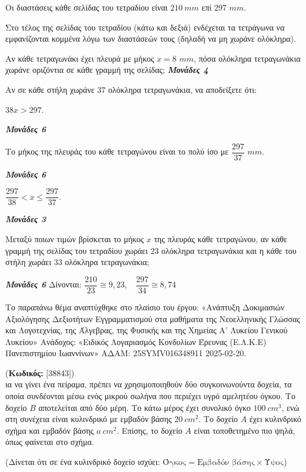 \documentclass[11pt,a4paper,twoside]{book}
\newcounter{askhsh}[chapter]
\renewcommand{\theaskhsh}{
	\bf{\titlefont{\Large{\thechapter}}.\arabic{askhsh}}
}
\newcommand{\Askhsh}[2]{\refstepcounter{askhsh}{\titlefont{Άσκηση\theaskhsh} - \textcolor{maincolor}{ΘΕΜΑ #2}} (\small{\textbf{Κωδικός:} #1})\\}{}
\newcommand{\monades}[1]{
\hspace*{\fill}
\textbf{\textit{\textcolor{maincolor}{Μονάδες #1}}}}
\begin{document}
Οι διαστάσεις κάθε σελίδας του τετραδίου είναι $210\ mm$ επί 297 $mm$.

Στο τέλος της σελίδας του τετραδίου (κάτω και δεξιά) ενδέχεται τα τετράγωνα να εμφανίζονται κομμένα λόγω των διαστάσεών τους (δηλαδή να μη χωράνε ολόκληρα).

\begin{alist}
\item Αν κάθε τετραγωνάκι έχει πλευρά με μήκος $x = 8$ $mm$, πόσα ολόκληρα τετραγωνάκια χωράνε οριζόντια σε κάθε γραμμή της σελίδας;\monades{4}
\item Αν σε κάθε στήλη χωράνε $37$ ολόκληρα τετραγωνάκια, να αποδείξετε ότι:

\begin{rlist}
\item $38x > 297$.
\monades{6}
\item Το μήκος της πλευράς του κάθε τετραγώνου είναι το πολύ ίσο με $\dfrac{297}{37}$ $mm$.
\monades{6}
\item $\dfrac{297}{38} < x \leq \dfrac{297}{37}.$
\monades{3}
\end{rlist}
\item Μεταξύ ποιων τιμών βρίσκεται το μήκος $x$ της πλευράς κάθε τετραγώνου, αν κάθε γραμμή της σελίδας του τετραδίου χωράει $23$ ολόκληρα τετραγωνάκια και η κάθε του στήλη χωράει $33$ ολόκληρα τετραγωνάκια;
\monades{6}
Δίνονται: $\dfrac{210}{23} \cong 9,23,\ \ \ \ \dfrac{297}{34} \cong 8,74$
\end{alist}
{\footnotesize Το παραπάνω θέμα αναπτύχθηκε στο πλαίσιο του έργου: «Ανάπτυξη Δοκιμασιών Αξιολόγησης Δεξιοτήτων Εγγραμματισμού στα μαθήματα της Νεοελληνικής Γλώσσας και Λογοτεχνίας, της Άλγεβρας, της Φυσικής και της Χημείας Α' Λυκείου Γενικού Λυκείου» Ανάδοχος: «Ειδικός Λογαριασμός Κονδυλίων Έρευνας (Ε.Λ.Κ.Ε) Πανεπιστημίου Ιωαννίνων» ΑΔΑΜ: 25SYMV016348911 2025-02-20.
}

\vspace{4mm}

\Askhsh{[38843]}
Για να γίνει ένα πείραμα, πρέπει να χρησιμοποιηθούν δύο συγκοινωνούντα δοχεία, τα οποία συνδέονται μέσω ενός μικρού σωλήνα που περιέχει υγρό αμελητέου όγκου. Το δοχείο $B$ αποτελείται από δύο μέρη. Το κάτω μέρος έχει συνολικό όγκο $100\ cm^{3}$, ενώ στη συνέχεια είναι κυλινδρικό με εμβαδόν βάσης $20\ cm^{2}$. Το δοχείο $A$ έχει κυλινδρικό σχήμα και εμβαδόν βάσης $a\ cm^{2}$. Επίσης, το δοχείο $A$ είναι τοποθετημένο πιο ψηλά, όπως φαίνεται στο σχήμα.

(Δίνεται ότι σε ένα κυλινδρικό δοχείο ισχύει: $\text{Όγκος} = \text{Εμβαδόν βάσης} \times \text{Ύψος}$)
\end{document}

